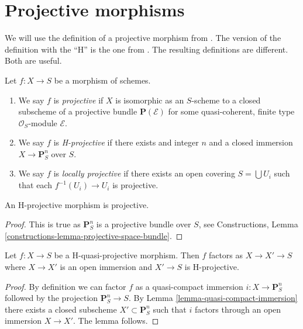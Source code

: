 \section{Projective morphisms}
\label{section-projective}

\noindent
We will use the definition of a projective morphism from \cite{EGA}.
The version of the definition with the ``H'' is the one
from \cite{H}. The resulting definitions are different. Both are useful.

\begin{definition}
\label{definition-projective}
Let $f : X \to S$ be a morphism of schemes.
\begin{enumerate}
\item We say $f$ is {\it projective} if $X$ is isomorphic as
an $S$-scheme to a closed subscheme of a projective
bundle $\mathbf{P}(\mathcal{E})$
for some quasi-coherent, finite type $\mathcal{O}_S$-module $\mathcal{E}$.
\item We say $f$ is {\it H-projective} if there exists and integer $n$ and
a closed immersion $X \to \mathbf{P}^n_S$ over $S$.
\item We say $f$ is {\it locally projective} if there exists an open
covering $S = \bigcup U_i$ such that each $f^{-1}(U_i) \to U_i$ is
projective.
\end{enumerate}
\end{definition}

\begin{lemma}
\label{lemma-H-projective}
An H-projective morphism is projective.
\end{lemma}

\begin{proof}
This is true as $\mathbf{P}^n_S$ is a projective bundle over $S$, see
Constructions, Lemma \ref{constructions-lemma-projective-space-bundle}.
\end{proof}

\begin{lemma}
\label{lemma-H-quasi-projective-open-H-projective}
Let $f : X \to S$ be a H-quasi-projective morphism.
Then $f$ factors as $X \to X' \to S$ where $X \to X'$ is an
open immersion and $X' \to S$ is H-projective.
\end{lemma}

\begin{proof}
By definition we can factor $f$ as a quasi-compact immersion
$i : X \to \mathbf{P}^n_S$ followed by the projection $\mathbf{P}^n_S \to S$.
By Lemma \ref{lemma-quasi-compact-immersion} there exists a closed
subscheme $X' \subset \mathbf{P}^n_S$ such that $i$ factors through
an open immersion $X \to X'$. The lemma follows.
\end{proof}

